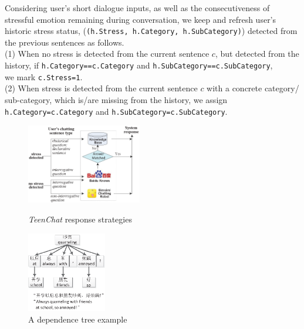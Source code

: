 Considering user's short dialogue inputs, as well as the consecutiveness of stressful emotion remaining
during conversation, we keep and refresh user's historic stress status,
(\texttt{(h.Stress, h.Category, h.SubCategory)}) detected from the previous sentences as follows. \\
\noindent (1) When no stress is detected from the current sentence $c$, but detected from the history,
if \texttt{h.Category==c.Category} and
\texttt{h.SubCategory==c.SubCategory},\\we mark \texttt{c.Stress=1}. \\
\noindent (2) When stress is detected from the current sentence $c$ with a concrete category/
sub-category, which
is/are missing from the history, we assign \\
\texttt{h.Category=c.Category} and \texttt{h.SubCategory=c.SubCategory}.
\begin{figure}
\makeatletter{}\makeatother
\begin{minipage}{.51\textwidth}
\centering
\includegraphics[height=3.5cm]{figs/ResponseStrategy.eps}
\caption{\emph{TeenChat} response strategies}
\label{fig:ResponseStrategy}
\end{minipage}
\makeatletter{}\makeatother
\begin{minipage}{.45\textwidth}
\centering
\includegraphics[height=3.5cm]{figs/dependenceTreeExample.eps}
\caption{A dependence tree example}
\label{fig:dependenceTree}
\end{minipage}
\end{figure}
